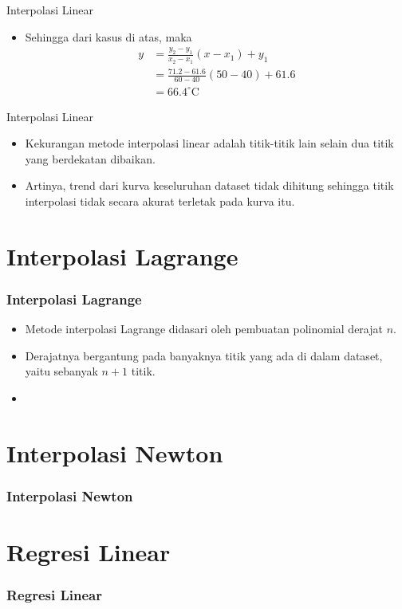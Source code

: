 \documentclass[pdflatex,compress]{beamer}
\begin{document}
\begin{frame}{Interpolasi Linear}
	\begin{itemize}
		\item Sehingga dari kasus di atas, maka
		\begin{align*}
			y &= \frac{y_2 - y_1}{x_2 - x_1}(x - x_1) +  y_1 \\
			&= \frac{71.2 - 61.6}{60 - 40}(50 - 40) +  61.6 \\
			&= 66.4^\circ \text{C}
		\end{align*}
	\end{itemize}
\end{frame}

\begin{frame}{Interpolasi Linear}
	\begin{itemize}
		\item Kekurangan metode interpolasi linear adalah titik-titik lain selain dua titik yang berdekatan dibaikan.
		\item Artinya, trend dari kurva keseluruhan dataset tidak dihitung sehingga titik interpolasi tidak secara akurat terletak pada kurva itu.
	\end{itemize}
\end{frame}

\section{Interpolasi Lagrange}

\begin{frame}
	\frametitle{Interpolasi Lagrange}
	\begin{itemize}
		\item Metode interpolasi Lagrange didasari oleh pembuatan polinomial derajat $ n $.
		\item Derajatnya bergantung pada banyaknya titik yang ada di dalam dataset, yaitu sebanyak $ n + 1 $ titik.
		\item 
	\end{itemize}
\end{frame}

\section{Interpolasi Newton}

\begin{frame}
	\frametitle{Interpolasi Newton}
\end{frame}

\section{Regresi Linear}

\begin{frame}
	\frametitle{Regresi Linear}
\end{frame}
\end{document}
